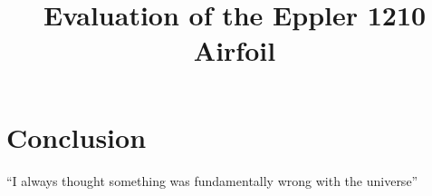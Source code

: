 \documentclass{article}
\title{Evaluation of the Eppler 1210 Airfoil}
\begin{document}
\maketitle











\section{Conclusion}
``I always thought something was fundamentally wrong with the universe'' \citep{adams1995hitchhiker}



\end{document}
